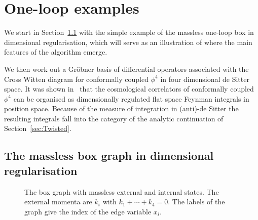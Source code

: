 \documentclass[a4paper,12pt]{article}
\numberwithin{equation}{section}
\numberwithin{figure}{section}
\begin{document}
\section{One-loop examples}\label{sec:oneloop}
We start in Section~\ref{sec:box} with the simple example of the
massless  one-loop box in dimensional regularisation, which will serve
as an illustration of where the main features of the algorithm emerge.

We then work out a Gr\"obner basis of differential operators
associated with the Cross Witten diagram for conformally coupled 
$\phi^4$  in  four dimensional  de Sitter space. It was shown
 in~\cite{Heckelbacher:2022fbx,Heckelbacher:2022hbq}  that the
 cosmological correlators of conformally coupled $\phi^4$ can be organised  as dimensionally regulated flat space Feynman integrals in position
space. Because of the measure of integration in (anti)-de Sitter the
resulting integrals fall into the category of the analytic
continuation of Section~\ref{sec:Twisted}. 


\subsection{The massless box graph in dimensional regularisation}\label{sec:box}
\begin{figure}[ht]
	\centering
\caption{The box  graph with massless external and internal states.
  The external momenta are $k_i$ with $k_1+\cdots+k_4=0$. The
          labels of the graph give the index of the edge variable $x_i$. }\label{fig:box}
\end{figure}
\end{document}
